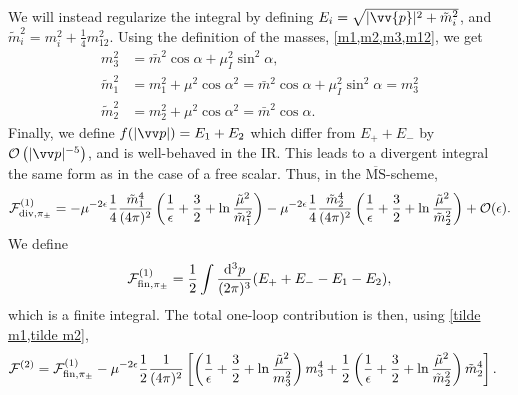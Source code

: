 We will instead regularize the integral by defining $E_i = \sqrt{|\vv{p}|^2 + \tilde m_i^2}$, and $\tilde m_i^2 = m_i^2 + \frac{1}{4} m_{12}^2$.
Using the definition of the masses, \cref{m1,m2,m3,m12}, we get
\begin{align}
    m_3^2 & = \bar m^2 \cos \alpha + \mu_ I^2 \sin^2 \alpha, \\
    \label{tilde m1}
    \tilde m_1^2 
    & 
    = m_1^2 + \mu^2 \cos\alpha^2
    = \bar m^2 \cos \alpha + \mu_I^2 \sin^2 \alpha
    = m_3^2 \\
    \label{tilde m2}
    \tilde m_2^2 
    & = m_2^2 + \mu^2 \cos\alpha^2
    = \bar m^2 \cos \alpha.
\end{align}
Finally, we define $f(|\vv p|) = E_1 + E_2$ which differ from $E_+ + E_-$ by $\Oh[-5]{|\vv p|}$, and is well-behaved in the IR.
This leads to a divergent integral the same form as in the case of a free scalar.
Thus, in the $\mathrm{\overline{MS}}$-scheme, 
\begin{equation}
    \mathcal{F}^{(1)}_{\mathrm{div}, \pi_\pm }
    =
    - \mu^{-2 \epsilon} \frac{1}{4} \frac{\tilde m_1^4}{(4\pi)^2} 
    \left(
        \frac{1}{\epsilon} + \frac{3}{2} + \ln \frac{\tilde \mu^2}{\tilde m_1^2}
    \right) 
    -  \mu^{-2 \epsilon} \frac{1}{4} \frac{\tilde m_2^4}{(4\pi)^2} 
    \left(
        \frac{1}{\epsilon} + \frac{3}{2} + \ln \frac{\tilde \mu^2}{\tilde m_2^2}
    \right) 
    + \mathcal{O}(\epsilon).
\end{equation}
We define
\begin{equation}
    \mathcal{F}^{(1)}_{\mathrm{fin}, \pi_\pm}
    = 
    \frac{1}{2} \int \frac{\dd^3 p}{(2\pi)^3} (E_+ + E_- - E_1 - E_2),
\end{equation}
which is a finite integral.
The total one-loop contribution is then, using \cref{tilde m1,tilde m2},
\begin{align}
    \mathcal{F}^{(2)}
    & = 
    \mathcal{F}^{(1)}_{\mathrm{fin}, \pi_\pm}
    - \mu^{-2 \epsilon} \frac{1}{2}\frac{1}{(4\pi)^2}
    \left[
        \left( \frac{1}{\epsilon} + \frac{3}{2} + \ln \frac{\tilde \mu^2}{m_3^2 } \right)
        m_3^4
        +
        \frac{1}{2}
        \left( \frac{1}{\epsilon} + \frac{3}{2} + \ln \frac{\tilde \mu^2}{\tilde m_2^2} \right)
        \tilde m_2^4
    \right].
\end{align}
